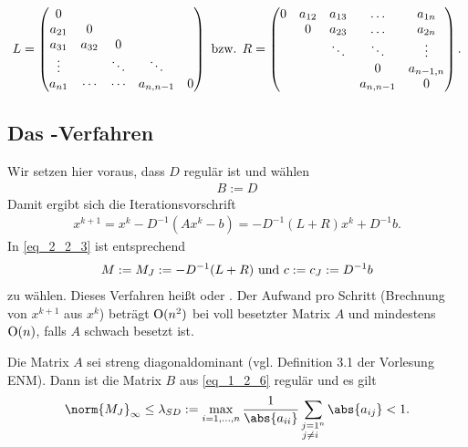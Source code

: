 \begin{align}
	L = 
	\begin{pmatrix}
		0      &        &        &           & \\
		a_{21} & 0      &        &           & \\
		a_{31} & a_{32} & 0      &           & \\
		\vdots &        & \ddots & \ddots    & \\
		a_{n1} & \cdots & \cdots & a_{n,n-1} & 0
	\end{pmatrix}
	 \text{ bzw. } R = 
	 \begin{pmatrix}
	 0      & a_{12} & a_{13} & \dots     & a_{1n}\\
	        & 0      & a_{23} & \dots     & a_{2n}\\
	        &        & \ddots & \ddots    & \vdots\\
	        &        &        & 0         & a_{n-1,n}\\
	        &        &        & a_{n,n-1} & 0
	 \end{pmatrix}.\notag
\end{align}

\subsection{Das -Verfahren}
Wir setzen hier voraus, dass $D$ regulär ist und wählen
\begin{align}
	B:= D \label{eq_1_2_6}
\end{align}
Damit ergibt sich die Iterationsvorschrift
\begin{align}
	x^{k+1} = x^k - D^{-1}(Ax^k - b) = -D^{-1}(L+R)x^k+D^{-1}b. \label{eq_1_2_7}
\end{align}
In \eqref{eq_2_2_3} ist entsprechend
\begin{align}
	M:= M_J := -D^{-1}(L+R) \text{ und } c:= c_J := D^{-1}b\notag 
\end{align}
zu wählen. Dieses Verfahren heißt  oder . Der Aufwand pro Schritt (Brechnung von $x^{k+1}$ aus $x^k$) beträgt $\operatorname{O}(n^2)$ bei voll besetzter Matrix $A$ und mindestens $\operatorname{O}(n)$, falls $A$ schwach besetzt ist.

\begin{proposition}
	Die Matrix $A$ sei streng diagonaldominant (vgl. Definition 3.1 der Vorlesung ENM). Dann ist die Matrix $B$ aus \eqref{eq_1_2_6} regulär und es gilt
	\begin{align}
	\norm{M_J}_{\infty} \le \lambda_{SD} := \max_{i = 1,\dots,n} \frac{1}{\abs{a_{ii}}} \sum_{\substack{j =1 \\ j\neq i}^{n}} \abs{a_{ij}} < 1.
	\end{align}
\end{proposition}

